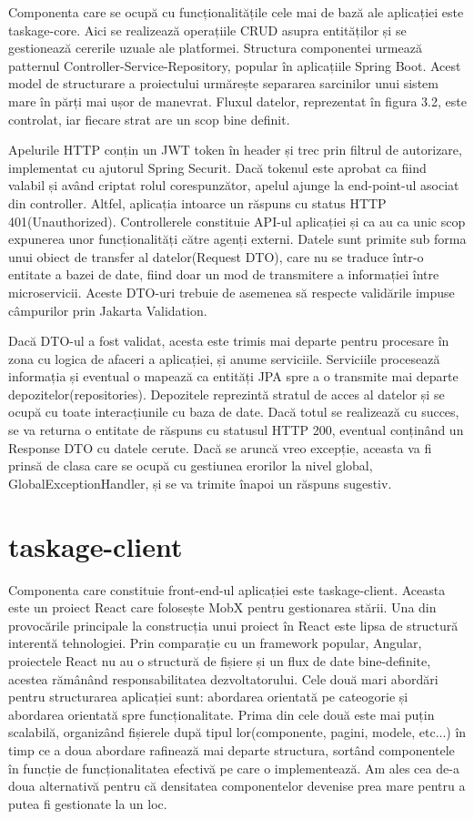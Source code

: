 Componenta care se ocupă cu funcționalitățile cele mai de bază ale aplicației este taskage-core. Aici se realizează operațiile CRUD asupra entităților și se gestionează cererile uzuale ale platformei. Structura componentei urmează patternul Controller-Service-Repository, popular în aplicațiile Spring Boot. Acest model de structurare a proiectului urmărește separarea sarcinilor unui sistem mare în părți mai ușor de manevrat. Fluxul datelor, reprezentat în figura 3.2, este controlat, iar fiecare strat are un scop bine definit. 

Apelurile HTTP conțin un JWT token în header și trec prin filtrul de autorizare, implementat cu ajutorul Spring Securit. Dacă tokenul este aprobat ca fiind valabil și având criptat rolul corespunzător, apelul ajunge la end-point-ul asociat din controller. Altfel, aplicația intoarce un răspuns cu status HTTP 401(Unauthorized). Controllerele constituie API-ul aplicației și ca au ca unic scop expunerea unor funcționalități către agenți externi. Datele sunt primite sub forma unui obiect de transfer al datelor(Request DTO), care nu se traduce într-o entitate a bazei de date, fiind doar un mod de transmitere a informației între microservicii. Aceste DTO-uri trebuie de asemenea să respecte validările impuse câmpurilor prin Jakarta Validation.

Dacă DTO-ul a fost validat, acesta este trimis mai departe pentru procesare în zona cu logica de afaceri a aplicației, și anume serviciile. Serviciile procesează informația și eventual o mapează ca entități JPA spre a o transmite mai departe depozitelor(repositories). Depozitele reprezintă stratul de acces al datelor și se ocupă cu toate interacțiunile cu baza de date. Dacă totul se realizează cu succes, se va returna o entitate de răspuns cu statusul HTTP 200, eventual conținând un Response DTO cu datele cerute. Dacă se aruncă vreo excepție, aceasta va fi prinsă de clasa care se ocupă cu gestiunea erorilor la nivel global, GlobalExceptionHandler, și se va trimite înapoi un răspuns sugestiv.

\section{taskage-client}

Componenta care constituie front-end-ul aplicației este taskage-client. Aceasta este un proiect React care folosește MobX pentru gestionarea stării. Una din provocările principale la construcția unui proiect în React este lipsa de structură interentă tehnologiei. Prin comparație cu un framework popular, Angular, proiectele React nu au o structură de fișiere și un flux de date bine-definite, acestea rămânând responsabilitatea dezvoltatorului. Cele două mari abordări pentru structurarea aplicației sunt: abordarea orientată pe cateogorie și abordarea orientată spre funcționalitate. Prima din cele două este mai puțin scalabilă, organizând fișierele după tipul lor(componente, pagini, modele, etc...) în timp ce a doua abordare rafinează mai departe structura, sortând componentele în funcție de funcționalitatea efectivă pe care o implementează. Am ales cea de-a doua alternativă pentru că densitatea componentelor devenise prea mare pentru a putea fi gestionate la un loc.

